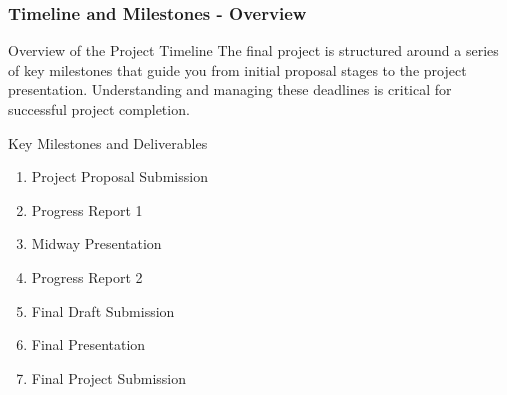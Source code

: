\documentclass[aspectratio=169]{beamer}
\begin{document}
\begin{frame}[fragile]
    \frametitle{Timeline and Milestones - Overview}
    \begin{block}{Overview of the Project Timeline}
        The final project is structured around a series of key milestones that guide you from initial proposal stages to the project presentation. Understanding and managing these deadlines is critical for successful project completion.
    \end{block}
    \begin{block}{Key Milestones and Deliverables}
        \begin{enumerate}
            \item Project Proposal Submission
            \item Progress Report 1
            \item Midway Presentation
            \item Progress Report 2
            \item Final Draft Submission
            \item Final Presentation
            \item Final Project Submission
        \end{enumerate}
    \end{block}
\end{frame}
\end{document}
